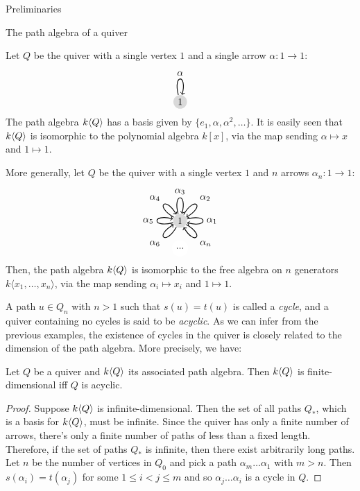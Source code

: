 \begin{chapter}{Preliminaries}
\begin{section}{The path algebra of a quiver}
\begin{exmp}\label{one-loop} Let $Q$ be the quiver with a single vertex $1$ and a single arrow $\alpha:1\to 1$:
\[
\begin{tikzpicture}[->, thick]
\tikzset{every loop/.style={looseness=15}}
\node[circle, fill=gray!30, minimum size=.5cm, inner sep=.07cm]  (1) {1};
\path (1) edge [loop above] node {$\alpha$} (1);
\end{tikzpicture}
\]
The path algebra $k\langle Q\rangle$ has a basis given by $\{e_1, \alpha, \alpha^2, \dots\}$. It is easily seen that $k\langle Q\rangle$ is isomorphic to the polynomial algebra $k[x]$, via the map sending $\alpha \mapsto x$ and $1\mapsto 1$.
\end{exmp}
\begin{exmp}\label{several-loops} More generally, let $Q$ be the quiver with a single vertex $1$ and $n$ arrows $\alpha_n:1\to 1$:
\[
\begin{tikzpicture}[->, auto, thick]
\tikzset{every loop/.style={looseness=15}}
\node[circle, fill=gray!30, minimum size=.5cm, inner sep=.07cm]  (1) {1};
\node[circle, fill=white] (2) at +(270: 1) {...};
\path (1) edge [loop left] node {$\alpha_5$} (1);
\path (1) edge [loop above] node {$\alpha_3$} (1);
\path (1) edge [loop right] node {$\alpha_1$} (1);
\path (1) edge [in=30, out=60, loop] node {$\alpha_2$} (1);
\path (1) edge [in=210, out=240, loop] node {$\alpha_6$} (1);
\path (1) edge [in=120, out=150, loop] node {$\alpha_4$} (1);
\path (1) edge [in=300, out=330, loop] node {$\alpha_n$} (1);
\end{tikzpicture}
\]
Then, the path algebra $k\langle Q\rangle$ is isomorphic to the free algebra on $n$ generators $k\langle x_1,\dots, x_n\rangle$, via the map sending $\alpha_i\mapsto x_i$ and $1\mapsto 1$.
\end{exmp}

A path $u\in Q_n$ with $n>1$ such that $s(u)=t(u)$ is called a \emph{cycle}, and a quiver containing no cycles is said to be \emph{acyclic}. As we can infer from the previous examples, the existence of cycles in the quiver is closely related to the dimension of the path algebra. More precisely, we have:

\begin{prop}\label{acyclic-fin-dim}
Let $Q$ be a quiver and $k\langle Q\rangle$ its associated path algebra. Then $k\langle Q\rangle$ is finite-dimensional iff $Q$ is acyclic.
\end{prop}
\begin{proof} Suppose $k\langle Q\rangle$ is infinite-dimensional. Then the set of all paths $Q_*$, which is a basis for $k\langle Q\rangle$, must be infinite. Since the quiver has only a finite number of arrows, there's only a finite number of paths of less than a fixed length. Therefore, if the set of paths $Q_*$ is infinite, then there exist arbitrarily long paths. Let $n$ be the number of vertices in $Q_0$ and pick a path $\alpha_m\dots\alpha_1$ with $m>n$. Then $s(\alpha_i) = t(\alpha_j)$ for some $1\leq i < j\leq m$ and so $\alpha_j\dots\alpha_i$ is a cycle in $Q$.


\end{proof}
\end{section}
\end{chapter}
